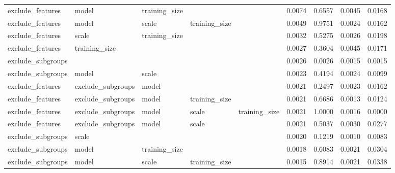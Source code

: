 \begin{table}
\begin{tabular}{llllrrrr}
 exclude\_features &             model & training\_size &               &               &                0.0074 &           0.6557 &         0.0045 &    0.0168 \\
 exclude\_features &             model &         scale & training\_size &               &                0.0049 &           0.9751 &         0.0024 &    0.0162 \\
 exclude\_features &             scale & training\_size &               &               &                0.0032 &           0.5275 &         0.0026 &    0.0198 \\
 exclude\_features &     training\_size &               &               &               &                0.0027 &           0.3604 &         0.0045 &    0.0171 \\
exclude\_subgroups &                   &               &               &               &                0.0026 &           0.0026 &         0.0015 &    0.0015 \\
exclude\_subgroups &             model &         scale &               &               &                0.0023 &           0.4194 &         0.0024 &    0.0099 \\
 exclude\_features & exclude\_subgroups &         model &               &               &                0.0021 &           0.2497 &         0.0023 &    0.0162 \\
 exclude\_features & exclude\_subgroups &         model & training\_size &               &                0.0021 &           0.6686 &         0.0013 &    0.0124 \\
 exclude\_features & exclude\_subgroups &         model &         scale & training\_size &                0.0021 &           1.0000 &         0.0016 &    0.0000 \\
 exclude\_features & exclude\_subgroups &         model &         scale &               &                0.0021 &           0.5037 &         0.0030 &    0.0277 \\
exclude\_subgroups &             scale &               &               &               &                0.0020 &           0.1219 &         0.0010 &    0.0083 \\
exclude\_subgroups &             model & training\_size &               &               &                0.0018 &           0.6083 &         0.0021 &    0.0304 \\
exclude\_subgroups &             model &         scale & training\_size &               &                0.0015 &           0.8914 &         0.0021 &    0.0338 \\

\end{tabular}
\end{table}
